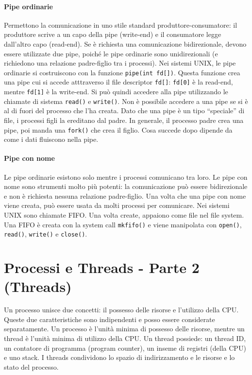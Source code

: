 \documentclass[a4paper]{article}
\begin{document}
\paragraph{Pipe ordinarie} Permettono la comunicazione in uno stile standard produttore-consumatore: il produttore scrive a un capo della pipe (write-end) e il consumatore legge dall'altro capo (read-end). Se è richiesta una comunicazione bidirezionale, devono essere utilizzate due pipe, poiché le pipe ordinarie sono unidirezionali (e richiedono una relazione padre-figlio tra i processi). \newline
Nei sistemi UNIX, le pipe ordinarie si costruiscono con la funzione \texttt{pipe(int fd[])}. Questa funzione crea una pipe cui si accede atttraverso il file descriptor \texttt{fd[]}: \texttt{fd[0]} è la read-end, mentre \texttt{fd[1]} è la write-end. Si può quindi accedere alla pipe utilizzando le chiamate di sistema \texttt{read()} e \texttt{write()}. Non è possibile accedere a una pipe se si è al di fuori del processo che l'ha creata. Dato che una pipe è un tipo ``speciale'' di file, i processi figli la ereditano dal padre. In generale, il processo padre crea una pipe, poi manda una \texttt{fork()} che crea il figlio. Cosa succede dopo dipende da come i dati fluiscono nella pipe.

\paragraph{Pipe con nome} Le pipe ordinarie esistono solo mentre i processi comunicano tra loro. Le pipe con nome sono strumenti molto più potenti: la comunicazione può essere bidirezionale e non è richiesta nessuna relazione padre-figlio. Una volta che una pipe con nome viene creata, può essere usata da molti processi per comunicare. Nei sistemi UNIX sono chiamate FIFO. Una volta create, appaiono come file nel file system. Una FIFO è creata con la system call \texttt{mkfifo()} e viene manipolata con \texttt{open()}, \texttt{read()}, \texttt{write()} e \texttt{close()}.


\section{Processi e Threads - Parte 2 (Threads)}

Un processo unisce due concetti: il possesso delle risorse e l'utilizzo della CPU. Queste due caratteristiche sono indipendenti e posso essere considerate separatamente. \newline
Un processo è l'unità minima di possesso delle risorse, mentre un thread è l'unità minima di utilizzo della CPU. Un thread possiede: un thread ID, un contatore di programma (program counter), un inseme di registri (della CPU) e uno stack. I threads condividono lo spazio di indirizzamento e le risorse e lo stato del processo.
\end{document}
